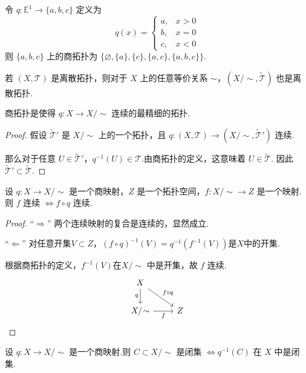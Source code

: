 \begin{instance}
    令 $q: \mathbb{E}^1 \to \{a, b, c\}$ 定义为
    \[ q(x) = \begin{cases} a, & x > 0 \\ b, & x = 0 \\ c, & x < 0 \end{cases} \]
    则 $\{a,b,c\}$ 上的商拓扑为 $\{\varnothing, \{a\}, \{c\}, \{a, c\}, \{a, b, c\}\}$.
\end{instance}

\begin{instance}
    若 $(X, \mathcal{T})$ 是离散拓扑，则对于 $X$ 上的任意等价关系 $\sim$，$(X/\!\sim, \tilde{\mathcal{T}})$ 也是离散拓扑.
\end{instance}

\begin{proposition}[][prop:8.1]
    商拓扑是使得 $q: X \to X/\!\sim$ 连续的最精细的拓扑.
\end{proposition}
\begin{proof}
    假设 $\tilde{\mathcal{T}}'$ 是 $X/\!\sim$ 上的一个拓扑，且 $q: (X, \mathcal{T}) \to (X/\!\sim, \tilde{\mathcal{T}}')$ 连续.\par
    那么对于任意 $U \in \tilde{\mathcal{T}}'$，$q^{-1}(U) \in \mathcal{T}$.由商拓扑的定义，这意味着 $U \in \tilde{\mathcal{T}}$.
    因此 $\tilde{\mathcal{T}}' \subset \tilde{\mathcal{T}}$.
\end{proof}

\begin{lemma}[商映射的连续特征][lem:8.1]
    设 $q: X \to X/\!\sim$ 是一个商映射，$Z$ 是一个拓扑空间，$f: X/\!\sim \to Z$ 是一个映射.
    则 $f$ 连续 $\iff f \circ q$ 连续.
\end{lemma}
\begin{proof}
    “$\Rightarrow$” 两个连续映射的复合是连续的，显然成立.

    “$\Leftarrow$” 对任意开集$V\subset Z$，$(f \circ q)^{-1}(V)=q^{-1}(f^{-1}(V))$是$X$中的开集.\par
    根据商拓扑的定义，$f^{-1}(V)$在$X/\!\sim$ 中是开集，故 $f$ 连续.
    \[
    \begin{tikzcd}
        X \arrow[rd, "f \circ q"] \arrow[d, "q"'] & \\
        X/\!\sim \arrow[r, "f"'] & Z
    \end{tikzcd}
    \]
\end{proof}

\begin{lemma}[][lem:8.2]
    设 $q: X \to X/\!\sim$ 是一个商映射.则 $C \subset X/\!\sim$ 是闭集 $\iff q^{-1}(C)$ 在 $X$ 中是闭集.
\end{lemma}

